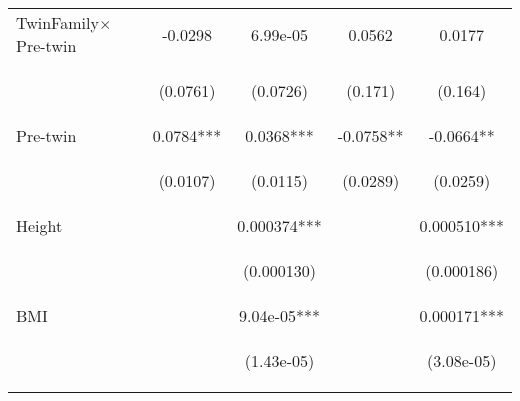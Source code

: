 \documentclass{article}[11pt,subeqn]
\begin{document}
\begin{spacing}{1.5}
\begin{table}
\begin{center}
\begin{tabular}{lcccc}
TwinFamily$\times$Pre-twin \ \ \	&	-0.0298	&	6.99e-05	&	0.0562	&	0.0177	\\   
\vspace{4pt}	& \begin{footnotesize}	(0.0761)	\end{footnotesize} & \begin{footnotesize}	(0.0726)	\end{footnotesize} & \begin{footnotesize}	(0.171)	\end{footnotesize} & \begin{footnotesize}	(0.164)	\end{footnotesize} \\
Pre-twin	&	0.0784***	&	0.0368***	&	-0.0758**	&	-0.0664**	\\   
\vspace{4pt}	& \begin{footnotesize}	(0.0107)	\end{footnotesize} & \begin{footnotesize}	(0.0115)	\end{footnotesize} & \begin{footnotesize}	(0.0289)	\end{footnotesize} & \begin{footnotesize}	(0.0259)	\end{footnotesize} \\
Height	&		&	0.000374***	&		&	0.000510***	\\   
\vspace{4pt}	& \begin{footnotesize}		\end{footnotesize} & \begin{footnotesize}	(0.000130)	\end{footnotesize} & \begin{footnotesize}		\end{footnotesize} & \begin{footnotesize}	(0.000186)	\end{footnotesize} \\
BMI	&		&	9.04e-05***	&		&	0.000171***	\\   
\vspace{4pt}	& \begin{footnotesize}		\end{footnotesize} & \begin{footnotesize}	(1.43e-05)	\end{footnotesize} & \begin{footnotesize}		\end{footnotesize} & \begin{footnotesize}	(3.08e-05)	\end{footnotesize} \\

\end{tabular}
\end{center}
\end{table}
\end{spacing}
\end{document}
